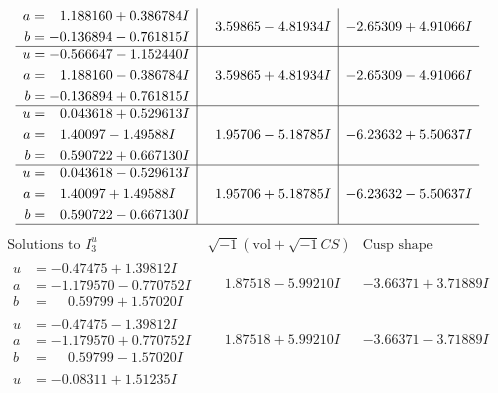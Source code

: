 \documentclass[1p]{elsarticle_modified}
\theoremstyle{definition}
\newcommand{\I}{\sqrt{-1}}
\begin{document}
$$\begin{array}{c|c|c}
\begin{aligned}
a &= \phantom{-}1.188160 + 0.386784 I \\
b &= -0.136894 - 0.761815 I\end{aligned}
 & \phantom{-}3.59865 - 4.81934 I & -2.65309 + 4.91066 I \\ \hline\begin{aligned}
u &= -0.566647 - 1.152440 I \\
a &= \phantom{-}1.188160 - 0.386784 I \\
b &= -0.136894 + 0.761815 I\end{aligned}
 & \phantom{-}3.59865 + 4.81934 I & -2.65309 - 4.91066 I \\ \hline\begin{aligned}
u &= \phantom{-}0.043618 + 0.529613 I \\
a &= \phantom{-}1.40097 - 1.49588 I \\
b &= \phantom{-}0.590722 + 0.667130 I\end{aligned}
 & \phantom{-}1.95706 - 5.18785 I & -6.23632 + 5.50637 I \\ \hline\begin{aligned}
u &= \phantom{-}0.043618 - 0.529613 I \\
a &= \phantom{-}1.40097 + 1.49588 I \\
b &= \phantom{-}0.590722 - 0.667130 I\end{aligned}
 & \phantom{-}1.95706 + 5.18785 I & -6.23632 - 5.50637 I\\
 \hline 
 \end{array}$$\newpage$$\begin{array}{c|c|c}  
\text{Solutions to }I^u_{3}& \I (\text{vol} + \sqrt{-1}CS) & \text{Cusp shape}\\
 \hline 
\begin{aligned}
u &= -0.47475 + 1.39812 I \\
a &= -1.179570 - 0.770752 I \\
b &= \phantom{-}0.59799 + 1.57020 I\end{aligned}
 & \phantom{-}1.87518 - 5.99210 I & -3.66371 + 3.71889 I \\ \hline\begin{aligned}
u &= -0.47475 - 1.39812 I \\
a &= -1.179570 + 0.770752 I \\
b &= \phantom{-}0.59799 - 1.57020 I\end{aligned}
 & \phantom{-}1.87518 + 5.99210 I & -3.66371 - 3.71889 I \\ \hline\begin{aligned}
u &= -0.08311 + 1.51235 I \\

\end{aligned}
\end{array}$$
\end{document}
